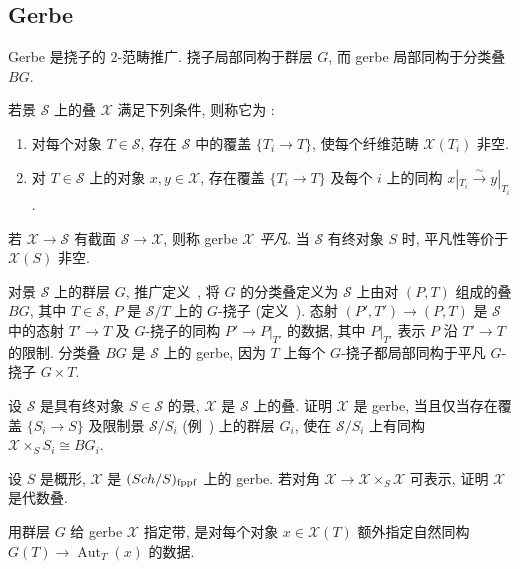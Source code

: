 \subsection{Gerbe}\label{src:7.4.2-subsection}
Gerbe 是挠子的 $2$-范畴推广. 挠子局部同构于群层 $G$, 而 gerbe 局部同构于分类叠 $BG$.
\begin{definition}[Gerbe]\label{src:7.4.6}
若景 $\mathcal S$ 上的叠 $\mathcal X$ 满足下列条件, 则称它为 :
\begin{enumerate}[(1)]
\item 对每个对象 $T\in\mathcal S$, 存在 $\mathcal S$ 中的覆盖 $\{T_i\to T\}$, 使每个纤维范畴 $\mathcal X(T_i)$ 非空.
\item 对 $T\in\mathcal S$ 上的对象 $x,y\in\mathcal X$, 存在覆盖 $\{T_i\to T\}$ 及每个 $i$ 上的同构 $x|_{T_i}\xrightarrow{\sim}y|_{T_i}$.
\end{enumerate}
若 $\mathcal X\to\mathcal S$ 有截面 $\mathcal S\to\mathcal X$, 则称 gerbe $\mathcal X$ \emph{平凡}. 当 $\mathcal S$ 有终对象 $S$ 时, 平凡性等价于 $\mathcal X(S)$ 非空.
\end{definition}
\begin{example}\label{src:7.4.7}
对景 $\mathcal S$ 上的群层 $G$, 推广定义~, 将 $G$ 的分类叠定义为 $\mathcal S$ 上由对 $(P,T)$ 组成的叠 $BG$, 其中 $T\in\mathcal S$, $P$ 是 $\mathcal S/T$ 上的 $G$-挠子 (定义~). 态射 $(P',T')\to(P,T)$ 是 $\mathcal S$ 中的态射 $T'\to T$ 及 $G$-挠子的同构 $P'\to P|_{T'}$ 的数据, 其中 $P|_{T'}$ 表示 $P$ 沿 $T'\to T$ 的限制. 分类叠 $BG$ 是 $\mathcal S$ 上的 gerbe, 因为 $T$ 上每个 $G$-挠子都局部同构于平凡 $G$-挠子 $G\times T$.
\end{example}
\begin{exercise}\label{src:7.4.8}
设 $\mathcal S$ 是具有终对象 $S\in\mathcal S$ 的景, $\mathcal X$ 是 $\mathcal S$ 上的叠. 证明 $\mathcal X$ 是 gerbe, 当且仅当存在覆盖 $\{S_i\to S\}$ 及限制景 $\mathcal S/S_i$ (例~) 上的群层 $G_i$, 使在 $\mathcal S/S_i$ 上有同构 $\mathcal X\times_S S_i\cong BG_i$.
\end{exercise}
\begin{exercise}\label{src:7.4.9}
设 $S$ 是概形, $\mathcal X$ 是 $(Sch/S)_{\mathrm{fppf}}$ 上的 gerbe. 若对角 $\mathcal X\to\mathcal X\times_S\mathcal X$ 可表示, 证明 $\mathcal X$ 是代数叠.
\end{exercise}
用群层 $G$ 给 gerbe $\mathcal X$ 指定带, 是对每个对象 $x\in\mathcal X(T)$ 额外指定自然同构 $G(T)\to\operatorname{Aut}_T(x)$ 的数据.
